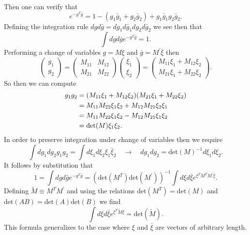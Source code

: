 Then one can verify that 
\begin{equation*}
e^{-g^T\bar{g}} = 1 - (g_1\bar{g}_1 + g_2\bar{g}_2) + g_1\bar{g}_1g_2\bar{g}_2.
\end{equation*}
Defining the integration rule $dgd\bar{g} = dg_1d\bar{g}_1dg_2d\bar{g}_2$ we see then that 
\begin{equation*}
\int dgd\bar{g}e^{-g^T\bar{g}} = 1.
\end{equation*}
Performing a change of variables $g = M\xi$ and $\bar{g} = M^{\prime}\bar{\xi}$ then 
\begin{equation*}
\left(\begin{array}{c} g_1 \\ g_2 \end{array}\right) = 
\left(\begin{array}{cc} M_{11} & M_{12} \\ M_{21} & M_{22} \end{array} \right) 
\left(\begin{array}{c} \xi_1 \\ \xi_2 \end{array} \right) =
\left(\begin{array}{c} M_{11}\xi_1 + M_{12}\xi_2 \\ M_{21}\xi_1 + M_{22}\xi_2 \end{array} \right).
\end{equation*} 
So then we can compute 
\begin{align*}
g_1g_2 &= (M_{11}\xi_1 + M_{12}\xi_2)(M_{21}\xi_1 + M_{22}\xi_2) \notag \\
&= M_{11}M_{22}\xi_1\xi_2 + M_{12}M_{21}\xi_2\xi_1 \notag \\
&= M_{11}M_{22}\xi_1\xi_2 - M_{12}M_{21}\xi_1\xi_2 \notag \\
&= \mathrm{det}(M)\xi_1\xi_2. 
\end{align*}
In order to preserve integration under change of variables then we require
\begin{equation*}
\int dg_1dg_2g_1g_2 = \int d\xi_1 d\xi_2 \xi_1 \bar{\xi}_2 \quad \longrightarrow \quad dg_1dg_2 = \mathrm{det}(M)^{-1}d\xi_1d\xi_2.
\end{equation*}
It follows by substitution that 
\begin{equation*}
1 = \int dgd\bar{g}e^{-g^T\bar{g}} = (\mathrm{det}(M^T)\mathrm{det}(M^{\prime}))^{-1} \int d\xi d\bar{\xi}e^{\xi^TM^TM^{\prime}\bar{\xi}}.
\end{equation*}
Defining $\tilde{M}\equiv M^TM^{\prime}$ and using the relations $\mathrm{det}(M^T) = \mathrm{det}(M)$ and $\mathrm{det}(AB) = \mathrm{det}(A)\mathrm{det}(B)$ we find 
\begin{equation*}
\int d\xi d\bar{\xi}e^{\xi^T\tilde{M}\bar{\xi}}  = \mathrm{det}(\tilde{M}).
\end{equation*}
This formula generalizes to the case where $\xi$ and $\bar{\xi}$ are vectors of arbitrary length.

